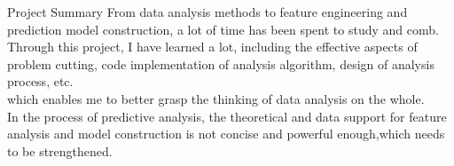 \documentclass[
 size=14pt,
 paper=smartboard,  %
 mode=present, 		%
 display=slides, 	%
 style=tuliplab,  	%
 pauseslide,
 fleqn,leqno]{powerdot}
\begin{document}
\begin{slide}{Project Summary}
  From data analysis methods to feature engineering and prediction model construction,
  a lot of time has been spent to study and comb.\\Through this project, I have learned a lot, 
  including the effective aspects of problem cutting, code implementation of analysis algorithm, 
  design of analysis process, etc.\\ which enables me to better grasp the thinking of data analysis on the whole.\\
  In the process of predictive analysis, the theoretical and data support for feature analysis and model construction 
  is not concise and powerful enough,which needs to be strengthened.
\end{slide}



\end{document}
